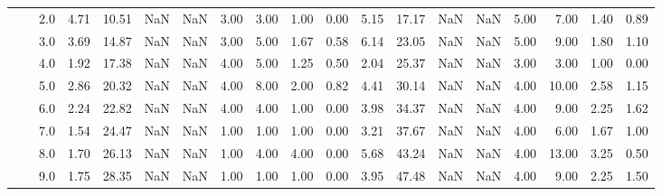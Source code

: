 \begin{tabular}{lllrrrrrrrrrrrrrrrr}
          &     & 2.0  &      4.71 &      10.51 &               NaN &                NaN &  3.00 &   3.00 &             1.00 &                         0.00 &      5.15 &      17.17 &               NaN &                NaN &  5.00 &   7.00 &             1.40 &                         0.89 \\
          &     & 3.0  &      3.69 &      14.87 &               NaN &                NaN &  3.00 &   5.00 &             1.67 &                         0.58 &      6.14 &      23.05 &               NaN &                NaN &  5.00 &   9.00 &             1.80 &                         1.10 \\
          &     & 4.0  &      1.92 &      17.38 &               NaN &                NaN &  4.00 &   5.00 &             1.25 &                         0.50 &      2.04 &      25.37 &               NaN &                NaN &  3.00 &   3.00 &             1.00 &                         0.00 \\
          &     & 5.0  &      2.86 &      20.32 &               NaN &                NaN &  4.00 &   8.00 &             2.00 &                         0.82 &      4.41 &      30.14 &               NaN &                NaN &  4.00 &  10.00 &             2.58 &                         1.15 \\
          &     & 6.0  &      2.24 &      22.82 &               NaN &                NaN &  4.00 &   4.00 &             1.00 &                         0.00 &      3.98 &      34.37 &               NaN &                NaN &  4.00 &   9.00 &             2.25 &                         1.62 \\
          &     & 7.0  &      1.54 &      24.47 &               NaN &                NaN &  1.00 &   1.00 &             1.00 &                         0.00 &      3.21 &      37.67 &               NaN &                NaN &  4.00 &   6.00 &             1.67 &                         1.00 \\
          &     & 8.0  &      1.70 &      26.13 &               NaN &                NaN &  1.00 &   4.00 &             4.00 &                         0.00 &      5.68 &      43.24 &               NaN &                NaN &  4.00 &  13.00 &             3.25 &                         0.50 \\
          &     & 9.0  &      1.75 &      28.35 &               NaN &                NaN &  1.00 &   1.00 &             1.00 &                         0.00 &      3.95 &      47.48 &               NaN &                NaN &  4.00 &   9.00 &             2.25 &                         1.50 \\

\end{tabular}
